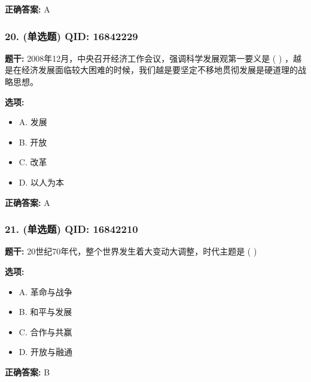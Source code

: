 \documentclass[12pt,UTF8]{ctexart}
\begin{document}
\textbf{正确答案:}
A

\vspace{0.3em}\hrulefill\vspace{0.7em}

\subsubsection*{20. (单选题) \small QID: 16842229}

\textbf{题干:}
2008年12月，中央召开经济工作会议，强调科学发展观第一要义是 ( ) ，越是在经济发展面临较大困难的时候，我们越是要坚定不移地贯彻发展是硬道理的战略思想。

\textbf{选项:}
\begin{itemize}[leftmargin=*]

  \item A. 发展

  \item B. 开放

  \item C. 改革

  \item D. 以人为本

\end{itemize}

\textbf{正确答案:}
A

\vspace{0.3em}\hrulefill\vspace{0.7em}

\subsubsection*{21. (单选题) \small QID: 16842210}

\textbf{题干:}
20世纪70年代，整个世界发生着大变动大调整，时代主题是 ( )

\textbf{选项:}
\begin{itemize}[leftmargin=*]

  \item A. 革命与战争

  \item B. 和平与发展

  \item C. 合作与共赢

  \item D. 开放与融通

\end{itemize}

\textbf{正确答案:}
B

\vspace{0.3em}\hrulefill\vspace{0.7em}
\end{document}
